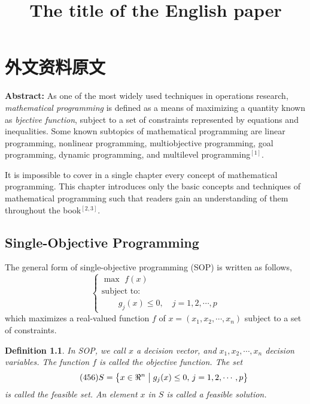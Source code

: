 
\chapter{外文资料原文}
\label{cha:engorg}

\title{The title of the English paper}

\textbf{Abstract:} As one of the most widely used techniques in operations
research, \emph{ mathematical programming} is defined as a means of maximizing a
quantity known as \emph{bjective function}, subject to a set of constraints
represented by equations and inequalities. Some known subtopics of mathematical
programming are linear programming, nonlinear programming, multiobjective
programming, goal programming, dynamic programming, and multilevel
programming$^{[1]}$.

It is impossible to cover in a single chapter every concept of mathematical
programming. This chapter introduces only the basic concepts and techniques of
mathematical programming such that readers gain an understanding of them
throughout the book$^{[2,3]}$.


\section{Single-Objective Programming}
The general form of single-objective programming (SOP) is written
as follows,
\begin{equation}\tag*{(123)} %
	\left\{\begin{array}{l}
		\max \,\,f(x)      \\[0.1 cm]
		\mbox{subject to:} \\ [0.1 cm]
		\qquad g_j(x)\le 0,\quad j=1,2,\cdots,p
	\end{array}\right.
\end{equation}
which maximizes a real-valued function $f$ of
$x=(x_1,x_2,\cdots,x_n)$ subject to a set of constraints.

\newtheorem{mpdef}{Definition}[chapter]
\begin{mpdef}
	In SOP, we call $x$ a decision vector, and
	$x_1,x_2,\cdots,x_n$ decision variables. The function
	$f$ is called the objective function. The set
	\begin{equation}\tag*{(456)} %
		S=\left\{x\in\Re^n\bigm|g_j(x)\le 0,\,j=1,2,\cdots,p\right\}
	\end{equation}
	is called the feasible set. An element $x$ in $S$ is called a
	feasible solution.
\end{mpdef}

